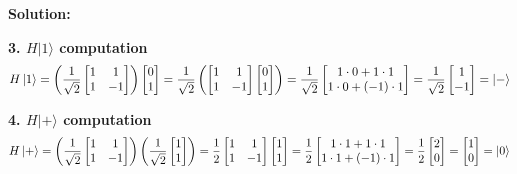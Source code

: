 \documentclass[11pt]{article}
\newenvironment{solution}
{\par\noindent\textbf{Solution:}\par}
{\vspace{1em}}
\begin{document}
\begin{solution}
\textbf{3. $H|1\rangle$ computation}
\[
H\ket{1} = \left(\frac{1}{\sqrt{2}} \begin{bmatrix}1&1\\1&-1\end{bmatrix}\right) \begin{bmatrix}0\\1\end{bmatrix} = \frac{1}{\sqrt{2}} \left(\begin{bmatrix}1&1\\1&-1\end{bmatrix} \begin{bmatrix}0\\1\end{bmatrix}\right) = \frac{1}{\sqrt{2}} \begin{bmatrix}1 \cdot 0 + 1 \cdot 1\\1 \cdot 0 + (-1) \cdot 1\end{bmatrix} = \frac{1}{\sqrt{2}} \begin{bmatrix}1\\-1\end{bmatrix} = \ket{-}
\]

\textbf{4. $H|+\rangle$ computation}
\[
H\ket{+} = \left(\frac{1}{\sqrt{2}} \begin{bmatrix}1&1\\1&-1\end{bmatrix}\right) \left(\frac{1}{\sqrt{2}} \begin{bmatrix}1\\1\end{bmatrix}\right) = \frac{1}{2} \begin{bmatrix}1&1\\1&-1\end{bmatrix} \begin{bmatrix}1\\1\end{bmatrix} = \frac{1}{2} \begin{bmatrix}1\cdot 1 + 1 \cdot 1\\1 \cdot 1 + (-1) \cdot 1\end{bmatrix} = \frac{1}{2} \begin{bmatrix}2\\0\end{bmatrix} = \begin{bmatrix}1\\0\end{bmatrix} = \ket{0}
\]


\end{solution}
\end{document}
